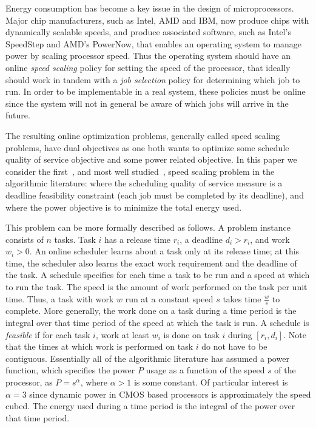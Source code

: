 \documentclass[11pt]{article}
\begin{document}
Energy consumption has become a key issue in the design of microprocessors.
Major chip manufacturers, such as Intel, AMD and IBM,
now produce chips with dynamically scalable speeds,
and produce associated software, such as Intel's SpeedStep and AMD's PowerNow,
that enables an operating system to manage
power by scaling processor speed. Thus the operating system should
have an online {\em speed scaling} policy for setting the speed
of the processor, that ideally should work in tandem with a 
{\em job selection} policy for determining which job to run.
In order to be implementable in a real system, these policies must be online since the
system will not in general be aware of which jobs will arrive in the future.

The resulting online optimization problems, generally called speed scaling
problems, have dual objectives as one both
wants to optimize some schedule quality of service objective
and some power related objective.
In this paper we consider the first~\cite{YDS}, 
and most well studied~\cite{YDS,BBCP,CCL+,BKPSTACS,BKP,LY,LLY,AMS,KK}, speed scaling problem in the
algorithmic literature:
where the scheduling quality of
service measure is a deadline feasibility constraint
(each job must be completed by its deadline), and where the power
objective is to minimize the total energy used.

This problem can be more formally described as follows.
A problem instance consists of $n$ tasks. Task $i$ has a release time
$r_i$, a deadline $d_i > r_i$, and work $w_i > 0$.
An online scheduler learns
about a task only at its release time; at this time, the scheduler also learns
the exact work requirement and the deadline of the task.
A schedule specifies for each time a task to be run and a speed at which to
run the task.
The speed is the amount of work performed on the task per unit time.
Thus, a task with work $w$ run at a constant speed $s$ takes time $\frac{w}{s}$
to complete.
More generally, the work done on a task during a
time period is the integral over that time period of the speed at which
the task is run.
A schedule is {\em feasible} if for each task $i$, work
at least $w_i$ is done on task $i$ during $[r_i, d_i]$.
Note that the times at which work is performed on task $i$ do not have to
be contiguous.
Essentially all of the algorithmic literature has assumed a power function,
which specifies the power $P$ usage as a function of the speed $s$ of
the processor, as $P=s^\alpha$, where $\alpha > 1$ is some constant.
Of particular interest is $\alpha=3$ since dynamic power in 
CMOS based processors is approximately the speed cubed.
The energy used during a time period is the integral of the power
over that time period.
\end{document}
